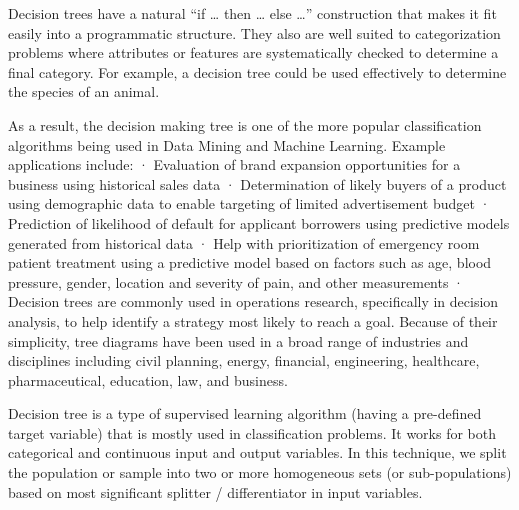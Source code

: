\documentclass[12pt]{article}
\begin{document}
Decision trees have a natural “if … then … else …” construction that makes it fit easily into a programmatic structure. They also are well suited to categorization problems where attributes or features are systematically checked to determine a final category. For example, a decision tree could be used effectively to determine the species of an animal.

As a result, the decision making tree is one of the more popular classification algorithms being used in Data Mining and Machine Learning. Example applications include:
· Evaluation of brand expansion opportunities for a business using historical sales data
· Determination of likely buyers of a product using demographic data to enable targeting of limited advertisement budget
· Prediction of likelihood of default for applicant borrowers using predictive models generated from historical data
· Help with prioritization of emergency room patient treatment using a predictive model based on factors such as age, blood pressure, gender, location and severity of pain, and other measurements
· Decision trees are commonly used in operations research, specifically in decision analysis, to help identify a strategy most likely to reach a goal.
Because of their simplicity, tree diagrams have been used in a broad range of industries and disciplines including civil planning, energy, financial, engineering, healthcare, pharmaceutical, education, law, and business.

Decision tree is a type of supervised learning algorithm (having a pre-defined target variable) that is mostly used in classification problems. It works for both categorical and continuous input and output variables. In this technique, we split the population or sample into two or more homogeneous sets (or sub-populations) based on most significant splitter / differentiator in input variables.
\end{document}
